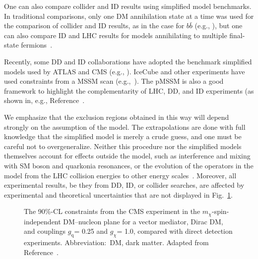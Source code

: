 \documentclass{ar-1col}
\newcommand{\chiDM}{\ensuremath{\chi}\xspace}
\newcommand{\gDM}{\ensuremath{g_{\chiDM}}\xspace}
\newcommand{\gdm}{\gDM}
\newcommand{\gq}{$g_{\mathrm{q}}$\xspace}
\newcommand{\mdm}{\ensuremath{m_{\chiDM}}\xspace}
\begin{document}
One can also compare collider and ID results using
simplified model benchmarks. In traditional comparisons, only one
DM annihilation state at a time was used for the comparison
of collider and ID results, as in the case for $b\bar{b}$ (e.g., ), but one can also compare ID and
LHC results for models annihilating to multiple final-state
fermions~\cite{Carpenter:2016thc}.

Recently, some DD and ID collaborations have adopted the benchmark
simplified models used by ATLAS and CMS (e.g.,
). IceCube and other
experiments have used constraints from a MSSM scan (e.g.,~). The pMSSM is also a good framework
to highlight the complementarity of LHC, DD, and ID experiments (as shown in, e.g.,
Reference~.

\begin{marginnote}[]
\end{marginnote}

We emphasize that the exclusion regions obtained in this
way will depend strongly on the assumption of the model. The
extrapolations are done with full knowledge that the simplified
model is merely a crude guess, and one must be careful not to
overgeneralize. Neither this procedure nor the
simplified models themselves account for effects outside the
model, such as interference and mixing with SM boson and quarkonia
resonances, or the evolution of the operators in the model from
the LHC collision energies to other energy
scales~\cite{DEramo:2014nmf}. Moreover, all experimental results,
be they from DD, ID, or collider searches, are affected by experimental and
theoretical uncertainties that are not displayed in Fig.~\ref{fig:SICMS}.

\begin{figure}[!htpb]
\caption{The 90\%-CL constraints from the CMS experiment in the
\mdm-spin-independent DM--nucleon plane for a vector mediator,
Dirac DM, and couplings \gq = 0.25 and \gdm = 1.0, compared with direct detection
experiments. Abbreviation:\ DM, dark matter. Adapted from Reference~.} \label{fig:SICMS}
\end{figure}
\end{document}
